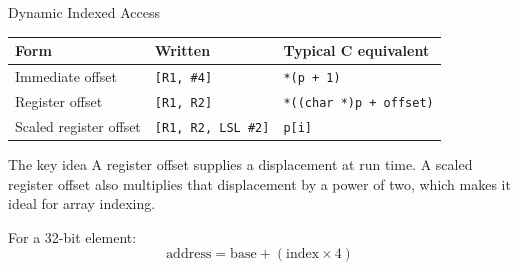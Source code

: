 \documentclass[9pt,aspectratio=169,xcolor=table]{beamer}
\begin{document}
\begin{frame}{Dynamic Indexed Access}
	\begin{center}
		{\small
			\striped
			\begin{tabular}{@{}l l l@{}}
				\toprule
				\textbf{Form} & \textbf{Written} & \textbf{Typical C equivalent} \\
				\midrule
				Immediate offset
				& \texttt{[R1, \#4]}
				& \texttt{*(p + 1)} \\[1mm]
				Register offset
				& \texttt{[R1, R2]}
				& \texttt{*((char *)p + offset)} \\[1mm]
				Scaled register offset
				& \texttt{[R1, R2, LSL \#2]}
				& \texttt{p[i]} \\
				\bottomrule
		\end{tabular}}
	\end{center}

	\vspace{4mm}

	\begin{block}{The key idea}
		{\small
			A register offset supplies a displacement at run time.
			A \alert{scaled} register offset also multiplies that
			displacement by a power of two, which makes it ideal for
			array indexing.}
	\end{block}

	\vspace{2mm}

	{\small
		For a 32-bit element:
		\[
		\text{address} = \text{base} + (\text{index} \times 4)
		\]
	}
\end{frame}
\end{document}
